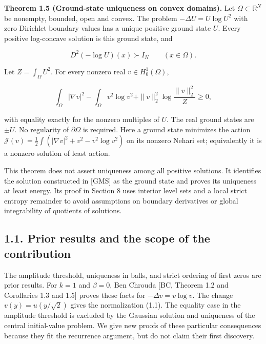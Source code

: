 \documentclass[11pt]{article}
\begin{document}
\textbf{Theorem 1.5 (Ground-state uniqueness on convex domains).} Let
\(\Omega\subset\mathbb R^N\) be nonempty, bounded, open and convex. The
problem \(-\Delta U=U\log U^2\) with zero Dirichlet boundary values has
a unique positive ground state \(U\). Every positive log-concave
solution is this ground state, and

\[D^2(-\log U)(x)\succ I_N\qquad(x\in\Omega).\]

Let \(Z=\int_\Omega U^2\). For every nonzero real
\(v\in H^1_0(\Omega)\),

\[\int_\Omega|\nabla v|^2-\int_\Omega v^2\log v^2
+\|v\|_2^2\log\frac{\|v\|_2^2}{Z}\geq0,\]

with equality exactly for the nonzero multiples of \(U\). The real
ground states are \(\pm U\). No regularity of \(\partial\Omega\) is
required. Here a ground state minimizes the action
\(\mathcal J(v)=\frac12\int(|\nabla v|^2+v^2-v^2\log v^2)\) on its
nonzero Nehari set; equivalently it is a nonzero solution of least
action.

This theorem does not assert uniqueness among all positive solutions. It
identifies the solution constructed in {[}GMS{]} as the ground state and
proves its uniqueness at least energy. Its proof in Section 8 uses
interior level sets and a local strict entropy remainder to avoid
assumptions on boundary derivatives or global integrability of quotients
of solutions.

\subsection{1.1. Prior results and the scope of the
contribution}\label{prior-results-and-the-scope-of-the-contribution}

The amplitude threshold, uniqueness in balls, and strict ordering of
first zeros are prior results. For \(k=1\) and \(\beta=0\), Ben Chrouda
{[}BC, Theorem 1.2 and Corollaries 1.3 and 1.5{]} proves these facts for
\(-\Delta v=v\log v\). The change \(v(y)=u(y/\sqrt2)\) gives the
normalization (1.1). The equality case in the amplitude threshold is
excluded by the Gaussian solution and uniqueness of the central
initial-value problem. We give new proofs of these particular
consequences because they fit the recurrence argument, but do not claim
their first discovery.
\end{document}
